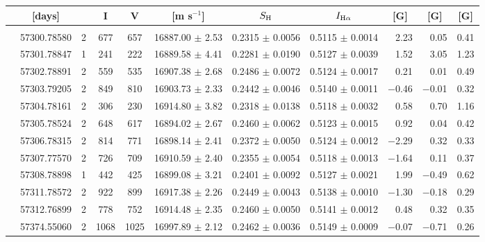 \documentclass[a4paper,fleqn,usenatbib]{mnras}
\begin{document}
\begin{table*}
\begin{threeparttable}
{\begin{tabular}{c c c c c c c c r r c}
& [days] & & I & V & [m s$^{-1}$] & $S_{\rm H}$ & $I_{\rm H\alpha}$ & \multicolumn{1}{c}{[G]} & \multicolumn{1}{c}{[G]} & [G] \\[3pt]
\hline
& & & & & & & &\\[-3pt]                    
\parbox[t]{1mm}{} & 57300.78580  & 2 & 677 & 657 & 16887.00 $\pm$ 2.53  &   0.2315 $\pm$ 0.0056  &   0.5115 $\pm$ 0.0014  &     2.23  & 0.05 & 0.41\\  
 & 57301.78847  & 1 & 241 & 222 &  16889.58 $\pm$ 4.41  &   0.2281 $\pm$ 0.0190  &   0.5127 $\pm$ 0.0039  &     1.52  &     3.05   &  1.23\\  
 & 57302.78891  & 2 & 559 & 535 &  16907.38 $\pm$ 2.68  &   0.2486 $\pm$ 0.0072  &   0.5124 $\pm$ 0.0017  &     0.21  &     0.01   &  0.49\\  
 & 57303.79205  & 2 & 849 & 810 &  16903.73 $\pm$ 2.33  &   0.2442 $\pm$ 0.0046  &   0.5140 $\pm$ 0.0011  &$-$0.46  &$-$0.01  & 0.32\\   
 & 57304.78161  & 2 & 306 & 230 &  16914.80 $\pm$ 3.82  &   0.2318 $\pm$ 0.0138  &   0.5118 $\pm$ 0.0032  &     0.58  &     0.70   & 1.16\\   
 & 57305.78524  & 2 & 648 & 617 &  16894.02 $\pm$ 2.67  &   0.2460 $\pm$ 0.0062  &   0.5123 $\pm$ 0.0015  &     0.92  &     0.04   & 0.42\\   
 & 57306.78315  & 2 & 814 & 771 &  16898.14 $\pm$ 2.41  &   0.2372 $\pm$ 0.0050  &   0.5124 $\pm$ 0.0012  &$-$2.29  &     0.32   & 0.33\\  
 & 57307.77570  & 2 & 726 & 709 &  16910.59 $\pm$ 2.40  &   0.2355 $\pm$ 0.0054  &   0.5118 $\pm$ 0.0013  &$-$1.64  &     0.11   & 0.37\\  
 & 57308.78898  & 1 & 442 & 425 &  16899.08 $\pm$ 3.21  &   0.2401 $\pm$ 0.0092  &   0.5127 $\pm$ 0.0021  &     1.99  &    $-$0.49   & 0.62\\  
 & 57311.78572  & 2 & 922 & 899 & 16917.38 $\pm$ 2.26  &   0.2449 $\pm$ 0.0043  &   0.5138 $\pm$ 0.0010  &$-$1.30  &    $-$0.18   & 0.29\\   
 & 57312.76899  & 2 & 778 & 752 & 16914.48 $\pm$ 2.35  &   0.2460 $\pm$ 0.0050  &   0.5141 $\pm$ 0.0012  &     0.48  &     0.32   &   0.35\\[3pt]
\parbox[t]{1mm}{}  & 57374.55060  & 2 & 1068 & 1025 &  16997.89 $\pm$ 2.12  &   0.2462 $\pm$ 0.0036  &   0.5149 $\pm$ 0.0009  &$-$0.07  & $-$0.71 & 0.26\\  

\end{tabular}}
\end{threeparttable}
\end{table*}
\end{document}
